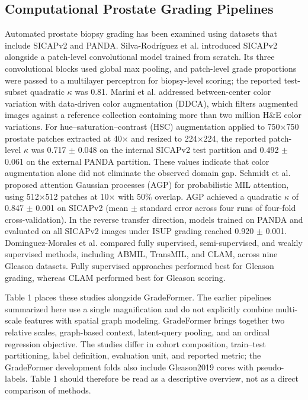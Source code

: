 \documentclass[11pt,a4paper]{article}
\begin{document}
\subsection{Computational Prostate Grading Pipelines}
Automated prostate biopsy grading has been examined using datasets that include SICAPv2 and PANDA. Silva-Rodríguez et al. \cite{ref12} introduced SICAPv2 alongside a patch-level convolutional model trained from scratch. Its three convolutional blocks used global max pooling, and patch-level grade proportions were passed to a multilayer perceptron for biopsy-level scoring; the reported test-subset quadratic $\kappa$ was 0.81. Marini et al. \cite{ref18} addressed between-center color variation with data-driven color augmentation (DDCA), which filters augmented images against a reference collection containing more than two million H\&E color variations. For hue--saturation--contrast (HSC) augmentation applied to 750$\times$750 prostate patches extracted at 40$\times$ and resized to 224$\times$224, the reported patch-level $\kappa$ was 0.717 $\pm$ 0.048 on the internal SICAPv2 test partition and 0.492 $\pm$ 0.061 on the external PANDA partition. These values indicate that color augmentation alone did not eliminate the observed domain gap. Schmidt et al. \cite{ref19} proposed attention Gaussian processes (AGP) for probabilistic MIL attention, using 512$\times$512 patches at 10$\times$ with 50\% overlap. AGP achieved a quadratic $\kappa$ of 0.847 $\pm$ 0.001 on SICAPv2 (mean $\pm$ standard error across four runs of four-fold cross-validation). In the reverse transfer direction, models trained on PANDA and evaluated on all SICAPv2 images under ISUP grading reached 0.920 $\pm$ 0.001. Dominguez-Morales et al. \cite{ref1} compared fully supervised, semi-supervised, and weakly supervised methods, including ABMIL, TransMIL, and CLAM, across nine Gleason datasets. Fully supervised approaches performed best for Gleason grading, whereas CLAM performed best for Gleason scoring.

Table 1 places these studies alongside GradeFormer. The earlier pipelines summarized here use a single magnification and do not explicitly combine multi-scale features with spatial graph modeling. GradeFormer brings together two relative scales, graph-based context, latent-query pooling, and an ordinal regression objective. The studies differ in cohort composition, train--test partitioning, label definition, evaluation unit, and reported metric; the GradeFormer development folds also include Gleason2019 cores with pseudo-labels. Table 1 should therefore be read as a descriptive overview, not as a direct comparison of methods.
\end{document}
